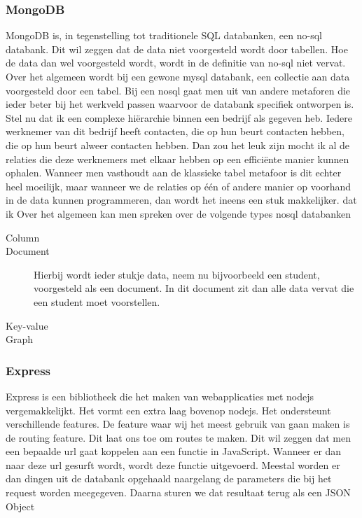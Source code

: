 \documentclass[a4paper,11pt]{article}
\begin{document}
\subsubsection{MongoDB}
MongoDB is, in tegenstelling tot traditionele SQL databanken, een 
no-sql databank. Dit wil zeggen dat de data niet voorgesteld wordt door 
tabellen. Hoe de data dan wel voorgesteld wordt, wordt in de definitie 
van no-sql niet vervat. Over het algemeen wordt bij een gewone mysql 
databank, een collectie aan data voorgesteld door een tabel. Bij een 
nosql gaat men uit van andere metaforen die ieder beter bij het 
werkveld passen waarvoor de databank specifiek ontworpen is. Stel nu 
dat ik een complexe hiërarchie binnen een bedrijf als gegeven heb. 
Iedere werknemer van dit bedrijf heeft contacten, die op hun beurt 
contacten hebben, die op hun beurt alweer contacten hebben. Dan zou 
het leuk zijn mocht ik al de relaties die deze werknemers met elkaar 
hebben op een efficiënte manier kunnen ophalen. Wanneer men vasthoudt 
aan de klassieke tabel metafoor is dit echter heel moeilijk, maar 
wanneer we de relaties op één of andere manier op voorhand in de data 
kunnen programmeren, dan wordt het ineens een stuk makkelijker.
dat ik  Over het algemeen kan men spreken over de 
volgende types nosql databanken

\begin{description}

\item[Column]
\item[Document] Hierbij wordt ieder stukje data, neem nu bijvoorbeeld 
een student, voorgesteld als een document. In dit document zit dan alle 
data vervat die een student moet voorstellen.
\item[Key-value]
\item[Graph]

\end{description}


\subsubsection{Express}
Express is een bibliotheek die het maken van webapplicaties met nodejs vergemakkelijkt. Het vormt een extra laag bovenop nodejs. Het ondersteunt verschillende features. De feature waar wij het meest gebruik van gaan maken is de routing feature. Dit laat ons toe om routes te maken. Dit wil zeggen dat men een bepaalde url gaat koppelen aan een functie in JavaScript. Wanneer er dan naar deze url gesurft wordt, wordt deze functie uitgevoerd. Meestal worden er dan dingen uit de databank opgehaald naargelang de parameters die bij het request worden meegegeven. Daarna sturen we dat resultaat terug als een JSON Object
\end{document}
